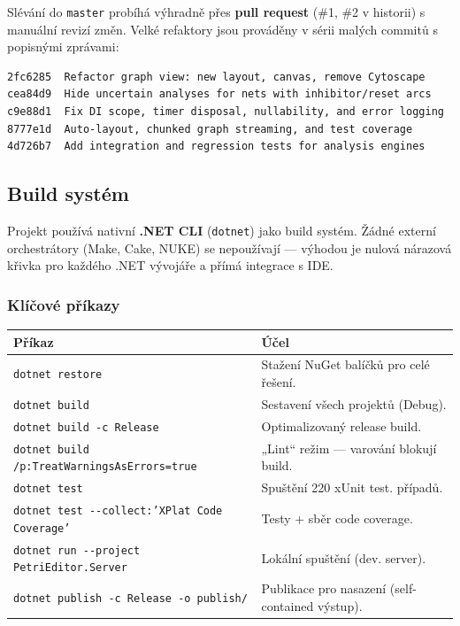 \documentclass[12pt,a4paper]{article}
\begin{document}
Slévání do \texttt{master} probíhá výhradně přes \textbf{pull request}
(\#1, \#2 v historii) s manuální revizí změn. Velké refaktory jsou
prováděny v sérii malých commitů s popisnými zprávami:

\begin{lstlisting}[language=bash]
2fc6285  Refactor graph view: new layout, canvas, remove Cytoscape
cea84d9  Hide uncertain analyses for nets with inhibitor/reset arcs
c9e88d1  Fix DI scope, timer disposal, nullability, and error logging
8777e1d  Auto-layout, chunked graph streaming, and test coverage
4d726b7  Add integration and regression tests for analysis engines
\end{lstlisting}

\subsection{Build systém}

Projekt používá nativní \textbf{.NET CLI} (\texttt{dotnet}) jako
build systém. Žádné externí orchestrátory (Make, Cake, NUKE)
se nepoužívají — výhodou je nulová nárazová křivka pro každého
.NET vývojáře a přímá integrace s IDE.

\subsubsection{Klíčové příkazy}

\begin{longtable}{@{}p{7.6cm}p{5.9cm}@{}}
    \toprule
    \textbf{Příkaz} & \textbf{Účel} \\
    \midrule
    \endhead
    \texttt{dotnet restore}                                            & Stažení NuGet balíčků pro celé řešení. \\
    \texttt{dotnet build}                                              & Sestavení všech projektů (Debug). \\
    \texttt{dotnet build -c Release}                                   & Optimalizovaný release build. \\
    \texttt{dotnet build /p:TreatWarningsAsErrors=true}                & „Lint“ režim — varování blokují build. \\
    \texttt{dotnet test}                                               & Spuštění 220 xUnit test. případů. \\
    \texttt{dotnet test -{-}collect:'XPlat Code Coverage'}             & Testy + sběr code coverage. \\
    \texttt{dotnet run -{-}project PetriEditor.Server}                 & Lokální spuštění (dev. server). \\
    \texttt{dotnet publish -c Release -o publish/}                     & Publikace pro nasazení (self-contained výstup). \\
    \bottomrule
\end{longtable}
\end{document}
